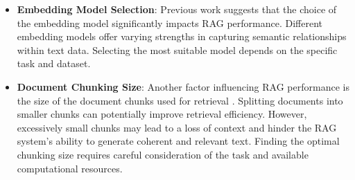 \begin{itemize}
    \item \textbf{Embedding Model Selection}:
 Previous work \cite{joshi2024RAGemb} suggests that the choice of the embedding model significantly impacts \ac{RAG} performance.
 Different embedding models offer varying strengths in capturing semantic relationships within text data.
 Selecting the most suitable model depends on the specific task and dataset.
    \item \textbf{Document Chunking Size}:
 Another factor influencing \ac{RAG} performance is the size of the document chunks used for retrieval \cite{theja2023RAGchunk}.
 Splitting documents into smaller chunks can potentially improve retrieval efficiency.
 However, excessively small chunks may lead to a loss of context and hinder the \ac{RAG} system's ability to generate coherent and relevant text.
 Finding the optimal chunking size requires careful consideration of the task and available computational resources.    
\end{itemize}




